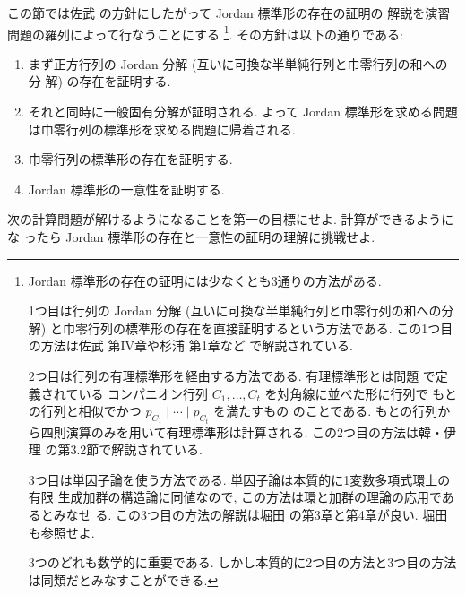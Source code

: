 \documentclass[12pt,twoside]{jarticle}
\begin{document}
この節では佐武 \cite{satake} の方針にしたがって Jordan 標準形の存在の証明の
解説を演習問題の羅列によって行なうことにする%
\footnote{Jordan 標準形の存在の証明には少なくとも3通りの方法がある. 

  1つ目は行列の Jordan 分解 (互いに可換な半単純行列と巾零行列の和への分解)
  と巾零行列の標準形の存在を直接証明するという方法である.  
  この1つ目の方法は佐武 \cite{satake} 第IV章や杉浦 \cite{sugiura} 第1章など
  で解説されている. 

  2つ目は行列の有理標準形を経由する方法である.
  有理標準形とは問題  で定義されている
  コンパニオン行列 $C_1,\dots,C_t$ を対角線に並べた形に行列で
  もとの行列と相似でかつ $p_{C_1}\mid\cdots\mid p_{C_t}$ を満たすもの
  のことである.  もとの行列から四則演算のみを用いて有理標準形は計算される.
  この2つ目の方法は韓・伊理 \cite{kan-iri} の第3.2節で解説されている.

  3つ目は単因子論を使う方法である.  単因子論は本質的に1変数多項式環上の有限
  生成加群の構造論に同値なので, この方法は環と加群の理論の応用であるとみなせ
  る.  この3つ目の方法の解説は堀田 \cite{10wa} の第3章と第4章が良い.
  堀田 \cite{gun-kagun} も参照せよ.

  3つのどれも数学的に重要である.
  しかし本質的に2つ目の方法と3つ目の方法は同類だとみなすことができる.
  }.
その方針は以下の通りである:
\begin{enumerate}
\item まず正方行列の Jordan 分解 (互いに可換な半単純行列と巾零行列の和への分
  解) の存在を証明する.
\item それと同時に一般固有分解が証明される.  
  よって Jordan 標準形を求める問題は巾零行列の標準形を求める問題に帰着される.
\item 巾零行列の標準形の存在を証明する.
\item Jordan 標準形の一意性を証明する.
\end{enumerate}

\bigskip

次の計算問題が解けるようになることを第一の目標にせよ.  計算ができるようにな
ったら Jordan 標準形の存在と一意性の証明の理解に挑戦せよ.
\end{document}

